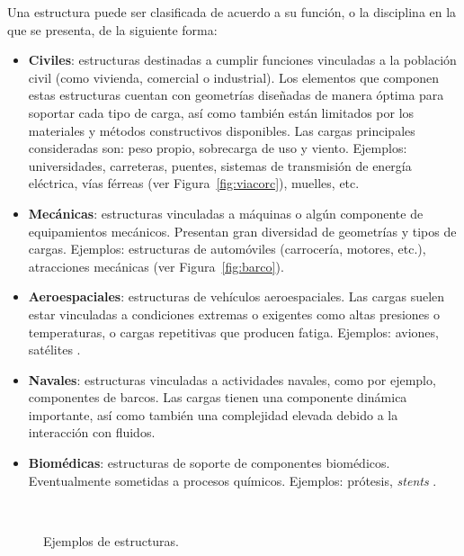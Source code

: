 Una estructura puede ser clasificada de acuerdo a su función, o la disciplina en la que se presenta, de la siguiente forma:
%
\begin{itemize}
  \item \textbf{Civiles}: estructuras destinadas a cumplir funciones vinculadas a la población civil (como vivienda, comercial o industrial). %
  Los elementos que componen estas estructuras cuentan con geometrías diseñadas de manera óptima para soportar cada tipo de carga, así como también están limitados por los materiales y métodos constructivos disponibles. %
  Las cargas principales consideradas son: peso propio, sobrecarga de uso y viento. Ejemplos: universidades, carreteras, puentes, sistemas de transmisión de energía eléctrica, vías férreas (ver Figura~\ref{fig:viacorc}), muelles, etc.
  \item \textbf{Mecánicas}: estructuras vinculadas a máquinas o algún componente de equipamientos mecánicos. Presentan gran diversidad de geometrías y tipos de cargas. Ejemplos: estructuras de automóviles (carrocería, motores, etc.), atracciones mecánicas (ver Figura~\ref{fig:barco}).
  \item \textbf{Aeroespaciales}: estructuras de vehículos aeroespaciales. Las cargas suelen estar vinculadas a condiciones extremas o exigentes como altas presiones o temperaturas, o cargas repetitivas que producen fatiga. Ejemplos: aviones, satélites \citep{Yoshiaki1992}.
  \item \textbf{Navales}: estructuras vinculadas a actividades navales, como por ejemplo, componentes de barcos. Las cargas tienen una componente dinámica importante, así como también una complejidad elevada debido a la interacción con fluidos.
  \item \textbf{Biomédicas}: estructuras de soporte de componentes biomédicos. Eventualmente sometidas a procesos químicos. Ejemplos: prótesis, \textit{stents} \citep{Frischkorn2015}.
\end{itemize}

\begin{figure}[htb]
	\centering
{}
~
\caption{Ejemplos de estructuras.}
	\label{fig:ejsestr}
\end{figure}

